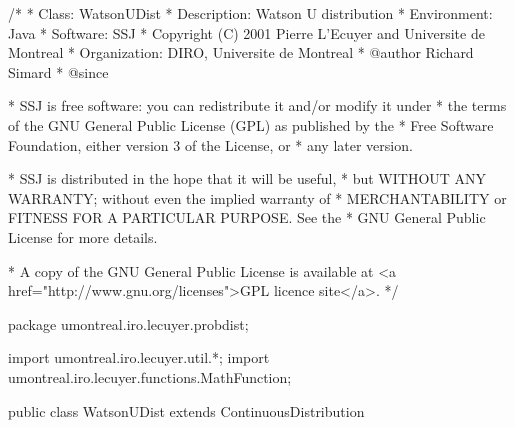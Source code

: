 \begin{code}
\begin{hide}
/*
 * Class:        WatsonUDist
 * Description:  Watson U  distribution 
 * Environment:  Java
 * Software:     SSJ 
 * Copyright (C) 2001  Pierre L'Ecuyer and Universite de Montreal
 * Organization: DIRO, Universite de Montreal
 * @author       Richard Simard
 * @since

 * SSJ is free software: you can redistribute it and/or modify it under
 * the terms of the GNU General Public License (GPL) as published by the
 * Free Software Foundation, either version 3 of the License, or
 * any later version.

 * SSJ is distributed in the hope that it will be useful,
 * but WITHOUT ANY WARRANTY; without even the implied warranty of
 * MERCHANTABILITY or FITNESS FOR A PARTICULAR PURPOSE.  See the
 * GNU General Public License for more details.

 * A copy of the GNU General Public License is available at
   <a href="http://www.gnu.org/licenses">GPL licence site</a>.
 */
\end{hide}
package umontreal.iro.lecuyer.probdist;
\begin{hide}
import umontreal.iro.lecuyer.util.*;
import umontreal.iro.lecuyer.functions.MathFunction;
\end{hide} 

public class WatsonUDist extends ContinuousDistribution\begin{hide} {
   private static final double XSEPARE = 0.15;
   private static final double PI = Math.PI;
   private static final int JMAX = 10;
   protected int n;

   private static class Function implements MathFunction {
      protected int n;
      protected double u;

      public Function (int n, double u) {
         this.n = n;
         this.u = u;
      }

      public double evaluate (double x) {
         return u - cdf(n,x);
      }
   }

   private static double cdfn (int n, double x) {
      // The 1/n correction for the cdf, for x < XSEPARE
      double terme;
      double v = Math.exp (-0.125/x);
      double somme = 0;
      int j = 0;

      do {
         double a = (2*j + 1)*(2*j + 1);
         terme = Math.pow (v, (double)(2*j + 1)*(2*j + 1));
         double der = terme*(a - 4.0*x)/(8.0*x*x);
         somme += (5.0*x - 1.0/12.0) * der / 12.0;
         der = terme* (a*a - 24.0*a*x + 48.0*x*x)/ (64.0*x*x*x*x);
         somme += x*x*der/6.0;
         ++j;
      } while (!(terme <= Math.abs(somme) * Num.DBL_EPSILON || j > JMAX));
      if (j > JMAX)
         System.err.println (x + ": watsonU:  somme 1/n has not converged");

      v = -2.0*somme/(n*Math.sqrt (2.0*PI*x));
      return v;
   }\end{hide}
\end{code}
